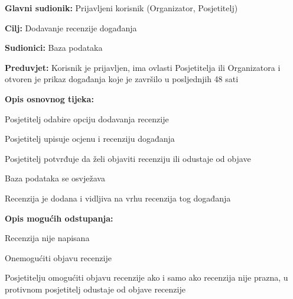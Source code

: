 	
	\noindent {}
	\begin{packed_item}
		
		\item \textbf{Glavni sudionik:} Prijavljeni korisnik (Organizator, Posjetitelj)
		\item  \textbf{Cilj:} Dodavanje recenzije događanja
		\item  \textbf{Sudionici:} Baza podataka
		\item  \textbf{Preduvjet:} Korisnik je prijavljen, ima ovlasti Posjetitelja ili Organizatora i otvoren je prikaz događanja koje je završilo u posljednjih 48 sati
		\item  \textbf{Opis osnovnog tijeka:}
		
		\item[] \begin{packed_enum}
			
			\item Posjetitelj odabire opciju dodavanja recenzije
			\item Posjetitelj upisuje ocjenu i recenziju događanja
			\item Posjetitelj potvrđuje da želi objaviti recenziju ili odustaje od objave
			\item Baza podataka se osvježava
			\item Recenzija je dodana i vidljiva na vrhu recenzija tog događanja
			
		\end{packed_enum}
		
		\item  \textbf{Opis mogućih odstupanja:}
		
		\item[] \begin{packed_item}
			
			\item[2.a] Recenzija nije napisana 
			\item[] \begin{packed_enum}
				
				\item Onemogućiti objavu recenzije 
				\item Posjetitelju omogućiti objavu recenzije ako i samo ako recenzija nije prazna, u protivnom posjetitelj odustaje od objave recenzije
				
			\end{packed_enum}		
		\end{packed_item}
		
	\end{packed_item}
	
